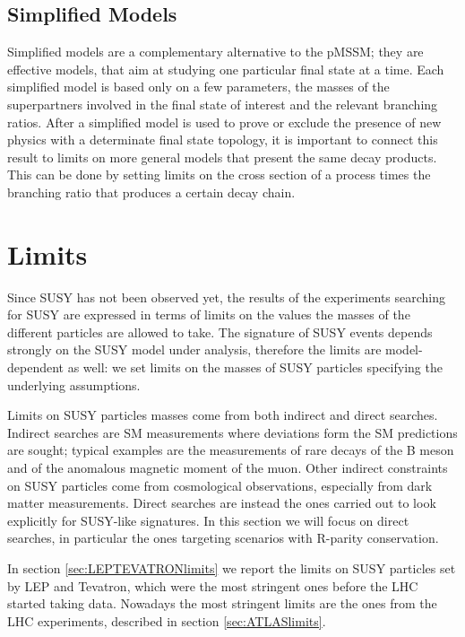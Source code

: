 \subsection{Simplified Models}

Simplified models \cite{Alves:simplifiedmodels} are a complementary alternative to the pMSSM; they are effective models, that aim at studying one particular final state at a time. Each simplified model is based only on a few parameters, the masses of the superpartners involved in the final state of interest and the relevant branching ratios. After a simplified model is used to prove or exclude the presence of new physics with a determinate final state topology, it is important to connect this result to limits on more general models that present the same decay products. This can be done by setting limits on the cross section of a process times the branching ratio that produces a certain decay chain.




\section{Limits}

Since SUSY has not been observed yet, the results of the experiments searching for SUSY are expressed in terms of limits on the values the masses of the different particles are allowed to take. The signature of SUSY events depends strongly on the SUSY model under analysis, therefore the limits are model-dependent as well: we set limits on the masses of SUSY particles specifying the underlying assumptions.

Limits on SUSY particles masses come from both indirect and direct searches. Indirect searches are SM measurements where deviations form the SM predictions are sought; typical examples are the measurements of rare decays of the B meson and of the anomalous magnetic moment of the muon. Other indirect constraints on SUSY particles come from cosmological observations, especially from dark matter measurements. Direct searches are instead the ones carried out to look explicitly for SUSY-like signatures. In this section we will focus on direct searches, in particular the ones targeting scenarios with R-parity conservation.

In section \ref{sec:LEPTEVATRONlimits} we report the limits on SUSY particles set by LEP and Tevatron, which were the most stringent ones before the LHC started taking data. Nowadays the most stringent limits are the ones from the LHC experiments, described in section \ref{sec:ATLASlimits}.

